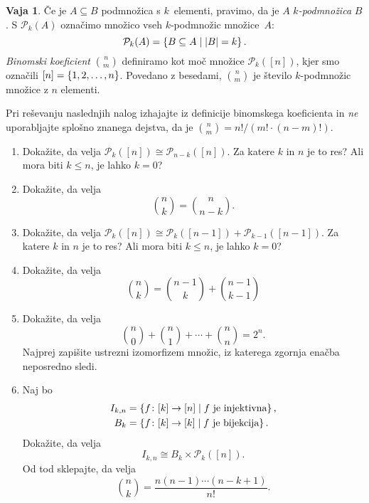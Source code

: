 \documentclass{article}
\newcommand{\pow}{\mathcal{P}}
\theoremstyle{definition}
\newtheorem{vaja}{Vaja}
\begin{document}
\begin{vaja}
  Če je $A \subseteq B$ podmnožica s $k$~elementi, pravimo, da je $A$ \emph{$k$-podmnožica} $B$.
  S $\pow_k(A)$ označimo množico vseh $k$-podmnožic množice~$A$:
  \begin{equation*}
    \pow_k(A) = \set{B \subseteq A}{|B| = k}.
  \end{equation*}
  \emph{Binomski koeficient} $n \choose m$ definiramo kot moč množice $\pow_k([n])$, kjer smo označili $[n] = \set{1, 2, \ldots, n}$. Povedano z besedami, $n \choose m$ je število $k$-podmnožic množice z $n$ elementi.
  
  Pri reševanju naslednjih nalog izhajajte iz definicije binomskega koeficienta in \emph{ne} uporabljajte splošno znanega dejstva, da je ${n \choose m} = n!/(m! \cdot (n - m)!)$.
  \begin{enumerate}
    \item
      Dokažite, da velja $\pow_k([n]) \cong \pow_{n - k}([n])$. Za katere $k$ in $n$ je to res? Ali mora biti $k \leq n$, je lahko $k = 0$?
    \item
      Dokažite, da velja
      \begin{equation*}
        {n \choose k} = {n \choose n - k}.
      \end{equation*}
    \item
      Dokažite, da velja $\pow_k([n]) \cong \pow_k([n-1]) + \pow_{k-1}([n-1])$. Za katere $k$ in $n$ je to res? Ali mora biti $k \leq n$, je lahko $k = 0$?
    \item
      Dokažite, da velja
      \begin{equation*}
        {n \choose k} = {n - 1 \choose k} + {n - 1 \choose k - 1}
      \end{equation*}
    \item
      Dokažite, da velja
      \begin{equation*}
        {n \choose 0} + {n \choose 1} + \cdots + {n \choose n} = 2^n.
      \end{equation*}
      Najprej zapišite ustrezni izomorfizem množic, iz katerega zgornja enačba neposredno sledi.
    \item
      Naj bo
      \begin{align*}
        I_{k,n} &= \set{f\colon [k] \to [n]}{\text{$f$ je injektivna}},\\
        B_k &= \set{f\colon [k] \to [k]}{\text{$f$ je bijekcija}}.
      \end{align*}
      Dokažite, da velja
      \begin{equation*}
        I_{k,n} \cong B_k \times \pow_k([n]).
      \end{equation*}
      Od tod sklepajte, da velja
      \begin{equation*}
         {n \choose k} = \frac{n (n-1) \cdots (n - k +1)}{n!}.
      \end{equation*}
  \end{enumerate}
\end{vaja}
\end{document}
